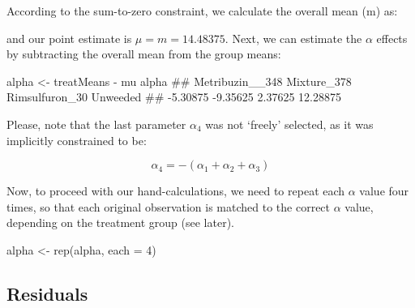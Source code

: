 \documentclass[a4paper,12pt,oneside]{book}
\newenvironment{Shaded}{\begin{snugshade}}{\end{snugshade}}
\newcommand{\DecValTok}[1]{#1}
\newcommand{\SpecialCharTok}[1]{#1}
\newcommand{\DocumentationTok}[1]{#1}
\newcommand{\OtherTok}[1]{#1}
\newcommand{\FunctionTok}[1]{#1}
\newcommand{\AttributeTok}[1]{#1}
\newcommand{\NormalTok}[1]{#1}
\begin{document}
According to the sum-to-zero constraint, we calculate the overall mean (m) as:

\vspace{12pt}

\begin{Shaded}
\end{Shaded}

and our point estimate is \(\mu = m = 14.48375\). Next, we can estimate the \(\alpha\) effects by subtracting the overall mean from the group means:

\vspace{12pt}

\begin{Shaded}
\begin{Highlighting}[]
\NormalTok{alpha }\OtherTok{\textless{}{-}}\NormalTok{ treatMeans }\SpecialCharTok{{-}}\NormalTok{ mu}
\NormalTok{alpha}
\DocumentationTok{\#\# Metribuzin\_\_348     Mixture\_378  Rimsulfuron\_30        Unweeded }
\DocumentationTok{\#\#        {-}5.30875        {-}9.35625         2.37625        12.28875}
\end{Highlighting}
\end{Shaded}

Please, note that the last parameter \(\alpha_4\) was not `freely' selected, as it was implicitly constrained to be:

\[\alpha_4 = - \left( \alpha_1 + \alpha_2 + \alpha_3 \right)\]

Now, to proceed with our hand-calculations, we need to repeat each \(\alpha\) value four times, so that each original observation is matched to the correct \(\alpha\) value, depending on the treatment group (see later).

\vspace{12pt}

\begin{Shaded}
\begin{Highlighting}[]
\NormalTok{alpha }\OtherTok{\textless{}{-}} \FunctionTok{rep}\NormalTok{(alpha, }\AttributeTok{each =} \DecValTok{4}\NormalTok{)}
\end{Highlighting}
\end{Shaded}

\hypertarget{residuals}{%
\subsection{Residuals}\label{residuals}}
\end{document}
